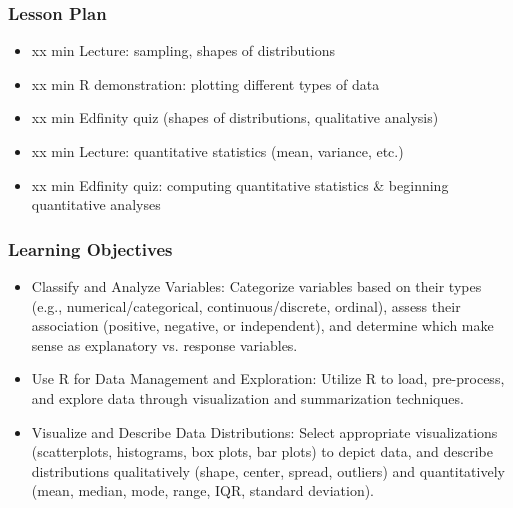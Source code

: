 \begin{frame}
    \frametitle{Lesson Plan}
    \begin{itemize}
        \item xx min Lecture: sampling, shapes of distributions
        \item xx min R demonstration: plotting different types of data
        \item xx min Edfinity quiz (shapes of distributions, qualitative analysis)
        \item xx min Lecture: quantitative statistics (mean, variance, etc.)
        \item xx min Edfinity quiz: computing quantitative statistics & beginning quantitative analyses
    \end{itemize}
\end{frame}
    
\begin{frame}
    \frametitle{Learning Objectives}
    \begin{itemize}
        \item Classify and Analyze Variables: Categorize variables based on their types (e.g., numerical/categorical, continuous/discrete, ordinal), assess their association (positive, negative, or independent), and determine which make sense as explanatory vs. response variables.
        \item Use R for Data Management and Exploration: Utilize R to load, pre-process, and explore data through visualization and summarization techniques.
        \item Visualize and Describe Data Distributions: Select appropriate visualizations (scatterplots, histograms, box plots, bar plots) to depict data, and describe distributions qualitatively (shape, center, spread, outliers) and quantitatively (mean, median, mode, range, IQR, standard deviation).
    \end{itemize}
\end{frame}